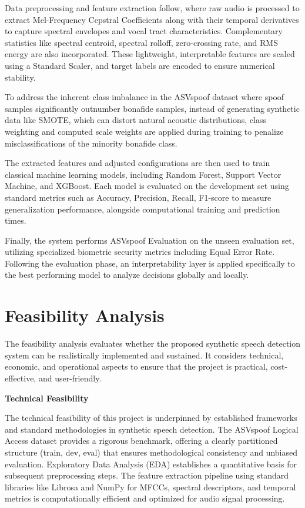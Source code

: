 \documentclass[12pt,a4paper]{report}
\begin{document}
Data preprocessing and feature extraction follow, where raw audio is processed to extract Mel-Frequency Cepstral Coefficients along with their temporal derivatives to capture spectral envelopes and vocal tract characteristics. Complementary statistics like spectral centroid, spectral rolloff, zero-crossing rate, and RMS energy are also incorporated. These lightweight, interpretable features are scaled using a Standard Scaler, and target labels are encoded to ensure numerical stability. 

To address the inherent class imbalance in the ASVspoof dataset where spoof samples significantly outnumber bonafide samples, instead of generating synthetic data like SMOTE, which can distort natural acoustic distributions, class weighting and computed scale weights are applied during training to penalize misclassifications of the minority bonafide class.

The extracted features and adjusted configurations are then used to train classical machine learning models, including Random Forest, Support Vector Machine, and XGBoost. Each model is evaluated on the development set using standard metrics such as Accuracy, Precision, Recall, F1-score to measure generalization performance, alongside computational training and prediction times.

Finally, the system performs ASVspoof Evaluation on the unseen evaluation set, utilizing specialized biometric security metrics including Equal Error Rate. Following the evaluation phase, an interpretability layer is applied specifically to the best performing model to analyze decisions globally and locally.


\section{Feasibility Analysis}

The feasibility analysis evaluates whether the proposed synthetic speech detection system can be realistically implemented and sustained. It considers technical, economic, and operational aspects to ensure that the project is practical, cost-effective, and user-friendly. 

\textbf{Technical Feasibility}

The technical feasibility of this project is underpinned by established frameworks and standard methodologies in synthetic speech detection. The ASVspoof Logical Access dataset provides a rigorous benchmark, offering a clearly partitioned structure (train, dev, eval) that ensures methodological consistency and unbiased evaluation. Exploratory Data Analysis (EDA) establishes a quantitative basis for subsequent preprocessing steps. The feature extraction pipeline using standard libraries like Librosa and NumPy for MFCCs, spectral descriptors, and temporal metrics is computationally efficient and optimized for audio signal processing. 
\end{document}
